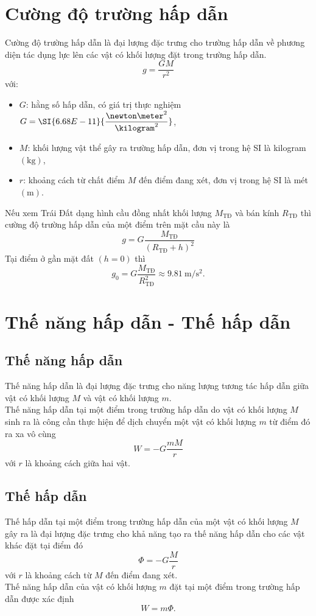 \section{Cường độ trường hấp dẫn}
Cường độ trường hấp dẫn là đại lượng đặc trưng cho trường hấp dẫn về phương diện tác dụng lực lên các vật có khối lượng đặt trong trường hấp dẫn.
$$g=\dfrac{GM}{r^2}$$
với:
\begin{itemize}
	\item $G$: hằng số hấp dẫn, có giá trị thực nghiệm $G=\SI{6.68E-11}{\dfrac{\newton\meter^2}{\kilogram^2}}$,
	\item $M$: khối lượng vật thể gây ra trường hấp dẫn, đơn vị trong hệ SI là kilogram $\left(\si{\kilogram}\right)$,
	\item $r$: khoảng cách từ chất điểm $M$ đến điểm đang xét, đơn vị trong hệ SI là mét $\left(\si{\meter}\right)$.
\end{itemize}
Nếu xem Trái Đất dạng hình cầu đồng nhất khối lượng $M_\text{TĐ}$ và bán kính $R_\text{TĐ}$ thì cường độ trường hấp dẫn của một điểm trên mặt cầu này là
$$g=G\dfrac{M_\text{TĐ}}{\left(R_\text{TĐ}+h\right)^2}$$
Tại điểm ở gần mặt đất $\left(h=0\right)$ thì
$$g_0=G\dfrac{M_\text{TĐ}}{R^2_\text{TĐ}}\approx\SI{9.81}{\meter/\second^2}.$$
\section{Thế năng hấp dẫn - Thế hấp dẫn}
\subsection{Thế năng hấp dẫn}
Thế năng hấp dẫn là đại lượng đặc trưng cho năng lượng tương tác hấp dẫn giữa vật có khối lượng $M$ và vật có khối lượng $m$.\\
Thế năng hấp dẫn tại một điểm trong trường hấp dẫn do vật có khối lượng $M$ sinh ra là công cần thực hiện để dịch chuyển một vật có khối lượng $m$ từ điểm đó ra xa vô cùng
$$W=-G\dfrac{mM}{r}$$
với $r$ là khoảng cách giữa hai vật.
\subsection{Thế hấp dẫn}
Thế hấp dẫn tại một điểm trong trường hấp dẫn của một vật có khối lượng $M$ gây ra là đại lượng đặc trưng cho khả năng tạo ra thế năng hấp dẫn cho các vật khác đặt tại điểm đó
$$\Phi=-G\dfrac{M}{r}$$
với $r$ là khoảng cách từ $M$ đến điểm đang xét.\\
Thế năng hấp dẫn của vật có khối lượng $m$ đặt tại một điểm trong trường hấp dẫn được xác định
$$W=m\Phi.$$